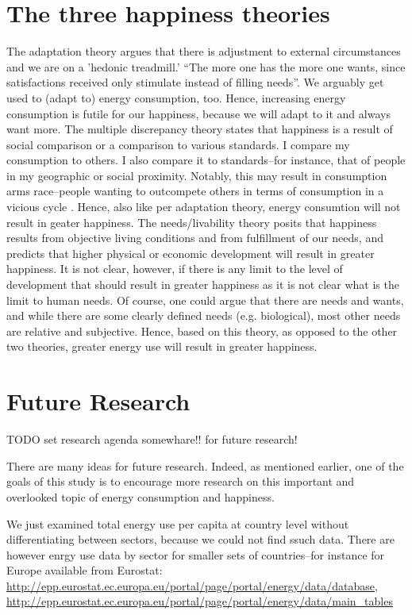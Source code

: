 \documentclass[10pt, letterpaper]{article}
\begin{document}
\begin{spacing}{1.4}
\section{The three happiness theories}
The adaptation theory \citep{brickman78cj} argues that there is
adjustment to external circumstances and we are on a 'hedonic
treadmill.' ``The more one has the more one wants, since satisfactions
received only stimulate instead of filling needs''\citep{durkheim50}. 
We arguably get used to (adapt to) energy consumption, too. Hence, increasing
energy consumption is futile for our happiness, because we will adapt to it and
always want more.
%
The  multiple discrepancy theory  \citep{michalos85} states that
happiness is a result of social comparison or a comparison to various
standards.  I compare my consumption to others. I also compare
it to standards--for instance, that of people in my geographic or social
proximity. Notably, this may result in consumption arms race--people wanting to
outcompete others in terms of consumption in a vicious
cycle \citep{frank12}. Hence, also like  per adaptation theory, energy consumtion
will not result in geater happiness.  
%
  The needs/livability theory \citep{veenhoven95, veenhoven14b} posits that
  happiness results from objective living conditions and from
  fulfillment of our needs, and predicts that higher physical or economic
  development will result in greater happiness. It is not clear, however, if
  there is any limit to the level of development that should result in greater
  happiness as it is not clear what is the limit to human needs. Of course, one
  could argue that there are needs and wants, and while there are some clearly
  defined needs (e.g. biological), most other needs are relative and
  subjective. Hence, based on this theory, as opposed to the other two theories,
  greater energy use will result in greater happiness.
  
\section{Future Research}

TODO set research agenda somewhare!! for future research!

There are many ideas for future research. Indeed, as mentioned earlier, one of
the goals of this study is to encourage more research on this important and
overlooked topic of energy consumption and happiness.

We just examined total energy use per capita at country level without
differentiating between sectors, because we could not find ssuch data. There are
however enrgy use data by sector for smaller sets of countries--for instance for
Europe available from Eurostat: 
\url{http://epp.eurostat.ec.europa.eu/portal/page/portal/energy/data/database}, \url{http://epp.eurostat.ec.europa.eu/portal/page/portal/energy/data/main_tables} 


\end{spacing}
\end{document}
